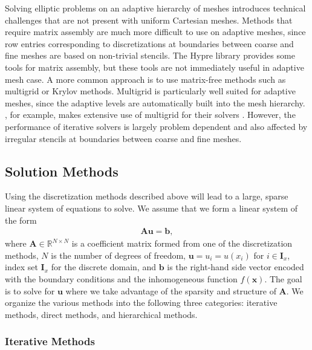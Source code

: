 Solving elliptic problems on an adaptive hierarchy of meshes introduces technical challenges that are not present with uniform Cartesian meshes. Methods that require matrix assembly are much more difficult to use on adaptive meshes, since row entries corresponding to discretizations at boundaries between coarse and fine meshes are based on non-trivial stencils.  The Hypre library \citep{falgout2002hypre} provides some tools for matrix assembly, but these tools are not immediately useful in adaptive mesh case. A more common approach is to use matrix-free methods such as multigrid or Krylov methods. Multigrid is particularly well suited for adaptive meshes, since the adaptive levels are automatically built into the mesh hierarchy. \amrex, for example, makes extensive use of multigrid for their solvers \citep{zhang2019amrex}.  However, the performance of iterative solvers is largely problem dependent and also affected by irregular stencils at boundaries between coarse and fine meshes.

\subsection{Solution Methods}
\label{sec:solution-methods-for-elliptic-pdes}

Using the discretization methods described above will lead to a large, sparse linear system of equations to solve. We assume that we form a linear system of the form
\begin{align}
    \textbf{A} \textbf{u} = \textbf{b},
    \label{eq:ls}
\end{align}
where $\textbf{A} \in \mathbb{R}^{N \times N}$ is a coefficient matrix formed from one of the discretization methods, $N$ is the number of degrees of freedom, $\textbf{u} = u_i = u(x_i)$ for $i \in \textbf{I}_x$, index set $\textbf{I}_x$ for the discrete domain, and $\textbf{b}$ is the right-hand side vector encoded with the boundary conditions and the inhomogeneous function $f(\textbf{x})$. The goal is to solve for $\textbf{u}$ where we take advantage of the sparsity and structure of $\textbf{A}$. We organize the various methods into the following three categories: iterative methods, direct methods, and hierarchical methods.

\subsubsection{Iterative Methods}
\label{sub:iterative-methods}


